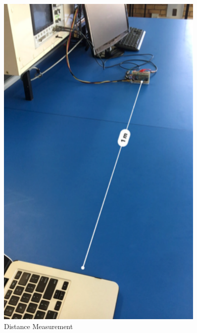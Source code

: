 \begin{figure}[h!]
\begin{minipage}{0.45\textwidth}
        \includegraphics[width = 0.9\textwidth]{images/dist.pdf}
    \caption{Distance Measurement}\label{fig:measure}
    \end{minipage}
\end{figure}
